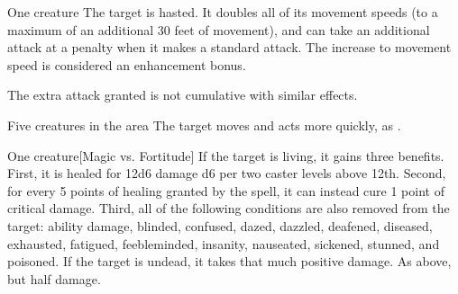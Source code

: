 \spelldur{\durshort}
\begin{spelltarget}{One creature}
    \spelleffect The target is hasted. It doubles all of its movement speeds (to a maximum of an additional 30 feet of movement), and can take an additional attack at a  penalty when it makes a standard attack. The increase to movement speed is considered an enhancement bonus.
\end{spelltarget}
\spellnotes The extra attack granted is not cumulative with similar effects.

\begin{spelltargets}{Five creatures in the area}
    \spelleffect The target moves and acts more quickly, as .
\end{spelltargets}

\spellrng{\rngclose}
\begin{spelltarget}{One creature}[Magic vs. Fortitude]
    \spelleffect If the target is living, it gains three benefits. First, it is healed for 12d6 damage \add d6 per two caster levels above 12th. Second, for every 5 points of healing granted by the spell, it can instead cure 1 point of critical damage. Third, all of the following conditions are also removed from the target: ability damage, blinded, confused, dazed, dazzled, deafened, diseased, exhausted, fatigued, feebleminded, insanity, nauseated, sickened, stunned, and poisoned.
    \spellsuccess If the target is undead, it takes that much positive damage.
    \spellfailure As above, but half damage.
\end{spelltarget}

